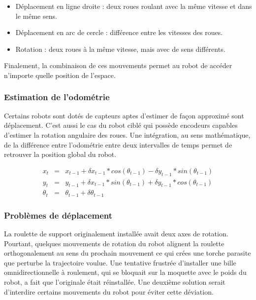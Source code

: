 \begin {itemize}
\item Déplacement en ligne droite : deux roues roulant avec la même vitesse et dans le même sens.

\item Déplacement en arc de cercle : différence entre les vitesses des roues.

\item Rotation : deux roues à la même vitesse, mais avec de sens différents.
\end{itemize}


Finalement, la combinaison de ces mouvements permet au robot de
accéder n'importe quelle position de l’espace.

\subsubsection{Estimation de l'odométrie}

Certains robots sont dotés de capteurs aptes d'estimer de façon
approximé sont déplacement. C'est aussi le cas du robot ciblé qui
possède encodeurs capables d'estimer la rotation angulaire des
roues. Une intégration, au sens mathématique, de la différence entre
l'odométrie entre deux intervalles de temps permet de retrouver la
position global du robot.

\begin{equation*}
	\begin{array}{rcl}
		x_t &=& x_{t-1} + \delta x_{t-1} * cos(\theta_{t-1}) - \delta y_{t-1} * sin(\theta_{t-1}) \\
		y_t &=& y_{t-1} + \delta x_{t-1} * sin(\theta_{t-1}) + \delta y_{t-1} * cos(\theta_{t-1}) \\
		\theta_t &=& \theta_{t-1} + \delta\theta_{t-1}
	\end{array}
\end{equation*}
\subsubsection{Problèmes de déplacement}


La roulette de support originalement installée avait deux axes de
rotation. Pourtant, quelques mouvements de rotation du robot alignent
la roulette orthogonalement au sens du prochain mouvement ce qui crées
une torche parasite que perturbe la trajectoire voulue. Une tentative
frustrée d'installer une bille omnidirectionnelle à roulement, qui se
bloquait sur la moquette avec le poids du robot, a fait que
l'originale était réinstallée. Une deuxième solution serait d'interdire
certains mouvements du robot pour éviter cette déviation.

